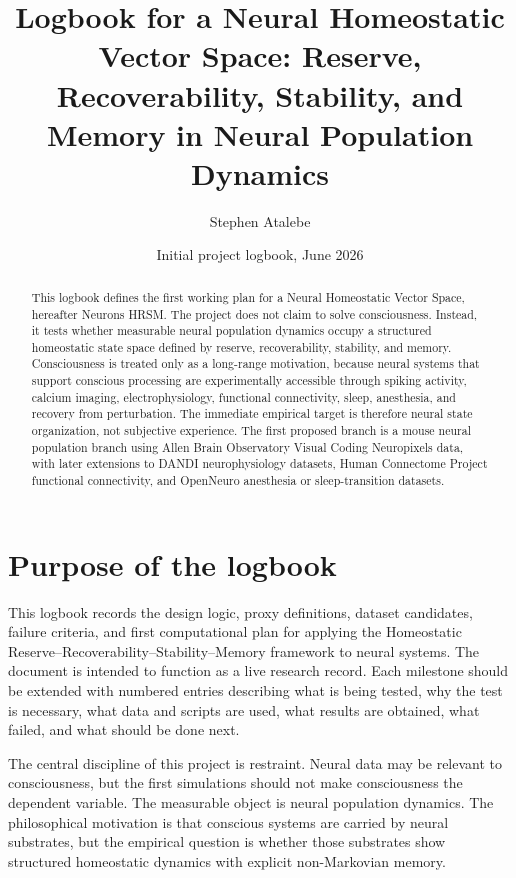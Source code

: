 \documentclass[11pt]{article}
\title{Logbook for a Neural Homeostatic Vector Space: Reserve, Recoverability, Stability, and Memory in Neural Population Dynamics}
\author{Stephen Atalebe}
\date{Initial project logbook, June 2026}
\begin{document}
\maketitle

\begin{abstract}
This logbook defines the first working plan for a Neural Homeostatic Vector Space, hereafter Neurons HRSM. The project does not claim to solve consciousness. Instead, it tests whether measurable neural population dynamics occupy a structured homeostatic state space defined by reserve, recoverability, stability, and memory. Consciousness is treated only as a long-range motivation, because neural systems that support conscious processing are experimentally accessible through spiking activity, calcium imaging, electrophysiology, functional connectivity, sleep, anesthesia, and recovery from perturbation. The immediate empirical target is therefore neural state organization, not subjective experience. The first proposed branch is a mouse neural population branch using Allen Brain Observatory Visual Coding Neuropixels data, with later extensions to DANDI neurophysiology datasets, Human Connectome Project functional connectivity, and OpenNeuro anesthesia or sleep-transition datasets.
\end{abstract}

\tableofcontents
\newpage

\section{Purpose of the logbook}

This logbook records the design logic, proxy definitions, dataset candidates, failure criteria, and first computational plan for applying the Homeostatic Reserve--Recoverability--Stability--Memory framework to neural systems. The document is intended to function as a live research record. Each milestone should be extended with numbered entries describing what is being tested, why the test is necessary, what data and scripts are used, what results are obtained, what failed, and what should be done next.

The central discipline of this project is restraint. Neural data may be relevant to consciousness, but the first simulations should not make consciousness the dependent variable. The measurable object is neural population dynamics. The philosophical motivation is that conscious systems are carried by neural substrates, but the empirical question is whether those substrates show structured homeostatic dynamics with explicit non-Markovian memory.
\end{document}
